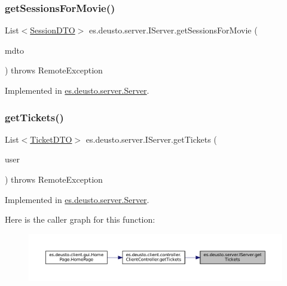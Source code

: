 \subsubsection{\texorpdfstring{getSessionsForMovie()}{getSessionsForMovie()}}
{\footnotesize\ttfamily List$<$\mbox{\hyperlink{classes_1_1deusto_1_1server_1_1data_1_1_session_d_t_o}{Session\+D\+TO}}$>$ es.\+deusto.\+server.\+I\+Server.\+get\+Sessions\+For\+Movie (\begin{DoxyParamCaption}\item[{\mbox{\hyperlink{classes_1_1deusto_1_1server_1_1data_1_1_movie_d_t_o}{Movie\+D\+TO}}}]{mdto }\end{DoxyParamCaption}) throws Remote\+Exception}



Implemented in \mbox{\hyperlink{classes_1_1deusto_1_1server_1_1_server_a33a6671bb4dc4bd9e23df10e53e5632d}{es.\+deusto.\+server.\+Server}}.

\mbox{\label{interfacees_1_1deusto_1_1server_1_1_i_server_ab782fc42997e35e5288e2b38a718b5c7}} 
\subsubsection{\texorpdfstring{getTickets()}{getTickets()}}
{\footnotesize\ttfamily List$<$\mbox{\hyperlink{classes_1_1deusto_1_1server_1_1data_1_1_ticket_d_t_o}{Ticket\+D\+TO}}$>$ es.\+deusto.\+server.\+I\+Server.\+get\+Tickets (\begin{DoxyParamCaption}\item[{\mbox{\hyperlink{classes_1_1deusto_1_1server_1_1data_1_1_user_d_t_o}{User\+D\+TO}}}]{user }\end{DoxyParamCaption}) throws Remote\+Exception}



Implemented in \mbox{\hyperlink{classes_1_1deusto_1_1server_1_1_server_ac46819596621f54e4c083d7ea49e3ff0}{es.\+deusto.\+server.\+Server}}.

Here is the caller graph for this function\+:
\nopagebreak
\begin{figure}[H]
\begin{center}
\leavevmode
\includegraphics[width=350pt]{interfacees_1_1deusto_1_1server_1_1_i_server_ab782fc42997e35e5288e2b38a718b5c7_icgraph}
\end{center}
\end{figure}
\mbox{\label{interfacees_1_1deusto_1_1server_1_1_i_server_a2dcd7f0b0e157eb797e20432c0b0e971}} 
